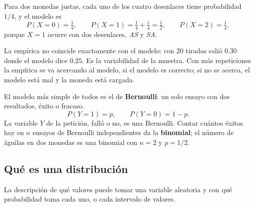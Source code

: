 \documentclass[11pt,letterpaper]{article}
\begin{document}
Para dos monedas justas, cada uno de los cuatro desenlaces tiene
probabilidad $1/4$, y el modelo es
\[
    P(X = 0) = \tfrac{1}{4} , \qquad
    P(X = 1) = \tfrac{1}{4} + \tfrac{1}{4} = \tfrac{1}{2} , \qquad
    P(X = 2) = \tfrac{1}{4} ,
\]
porque $X = 1$ ocurre con dos desenlaces, \textit{AS} y \textit{SA}.

\begin{center}
\end{center}

La empírica no coincide exactamente con el modelo: con $20$ tiradas
salió $0.30$ donde el modelo dice $0.25$. Es la variabilidad de la
muestra. Con más repeticiones la empírica se va acercando al modelo,
si el modelo es correcto; si no se acerca, el modelo está mal y la
moneda está cargada.

El modelo más simple de todos es el de \textbf{Bernoulli}: un solo
ensayo con dos resultados, éxito o fracaso.
\[
    P(Y = 1) = p , \qquad P(Y = 0) = 1 - p .
\]
La variable $Y$ de la petición, falló o no, es una Bernoulli. Contar
cuántos éxitos hay en $n$ ensayos de Bernoulli independientes da la
\textbf{binomial}; el número de águilas en dos monedas es una binomial
con $n = 2$ y $p = 1/2$.


\subsection*{Qué es una distribución}

\begin{definicion}
    La descripción de qué valores puede tomar una variable aleatoria y
    con qué probabilidad toma cada uno, o cada intervalo de valores.
\end{definicion}
\end{document}
